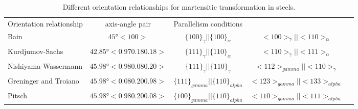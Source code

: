 
\begin{table*}
\caption{Different orientation relationships for martensitic transformation in steels.}
\label{tab_ORs}
\begin{tabular}{l c | c c c }
\hline\hline
    Orientation relationship & axis-angle pair & Parallelism conditions \\
    
    Bain \cite{bain1924nature} &
    $45°<100>$ &
    $\{100\}_{\gamma}||\{100\}_{\alpha}$ & $<100>_{\gamma}||<110>_{\alpha}$ \\
    
    Kurdjumov-Sachs \cite{kurdjumow1930mechanismus} &
    $42.85°<0.97 0.18 0.18>$ &
    $\{111\}_{\gamma}||\{110\}_{\alpha}$ &
    $<110>_{\gamma}||<111>_{\alpha}$ \\
    
    Nishiyama-Wassermann \cite{nishiyama1934x,wassermann1935ueber} &
    $45.98° <0.98 0.08 0.20>$ &
    $\{111\}_{\gamma}||\{110\}_{\gamma}$ &
    $<112>_{gamma}||<110>_{\gamma}$ \\
    
    Greninger and Troiano \cite{greninger1949mechanism} &
    $45.98° <0.08 0.20 0.98>$ &
    $\{111\}_{gamma} || \{110\}_{alpha}$ &
    $<123>_{gamma} || <133>_{alpha}$ \\
    
    Pitsch \cite{pitsch1962orientierungszusammenhang} &
    $45.98° <0.98 0.20 0.08>$ &
    $\{100\}_{gamma} || \{110\}_{alpha}$ &
    $<110>_{gamma} || <111>_{alpha}$ \\
\hline
\end{tabular}
\end{table*}
